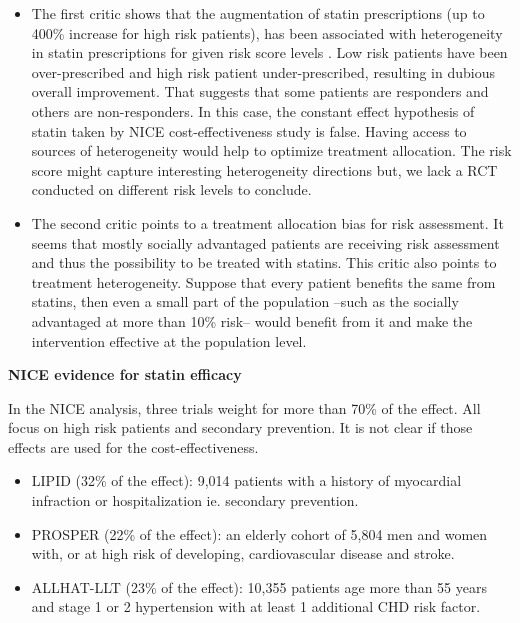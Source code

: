 \documentclass[10pt,letterpaper]{article}
\begin{document}
\begin{itemize}
    \item The first critic shows that the augmentation of statin prescriptions
          (up to 400\% increase for high risk patients), has been associated with
          heterogeneity in statin prescriptions for given risk score levels
          \cite{van2013efficiency}. Low risk patients have been over-prescribed
          and high risk patient under-prescribed, resulting in dubious overall
          improvement. That suggests that some patients are responders and
          others are non-responders. In this case, the constant effect
          hypothesis of statin taken by NICE cost-effectiveness study is false.
          Having access to sources of heterogeneity would help to optimize
          treatment allocation. The risk score might capture interesting
          heterogeneity directions but, we lack a RCT conducted on different
          risk levels to conclude.

    \item  The second critic points to a treatment allocation bias for risk
          assessment. It seems that mostly socially advantaged patients are
          receiving risk assessment and thus the possibility to be treated with
          statins. This critic also points to treatment heterogeneity.
          Suppose that every patient benefits the same from statins, then even a
          small part of the population --such as the socially advantaged at more
          than 10\% risk-- would benefit from it and make the intervention
          effective at the population level.
\end{itemize}



\textbf{NICE evidence for statin efficacy}

In the NICE analysis, three trials weight for more than 70\% of the effect. All
focus on high risk patients and secondary prevention. It is not clear if
those effects are used for the cost-effectiveness.

\begin{itemize}
    \item LIPID \cite{long1998prevention} (32\% of the effect): 9,014 patients with a history of
          myocardial infraction or hospitalization ie. secondary prevention.
    \item PROSPER \cite{shepherd2002pravastatin} (22\% of the effect): an elderly cohort of
          5,804 men and women with, or at high risk of developing, cardiovascular
          disease and stroke.
    \item ALLHAT-LLT \cite{antihypertensive2002major} (23\% of the effect): 10,355 patients age more than 55
          years and stage 1 or 2 hypertension with at least 1 additional CHD risk
          factor.
\end{itemize}
\end{document}
